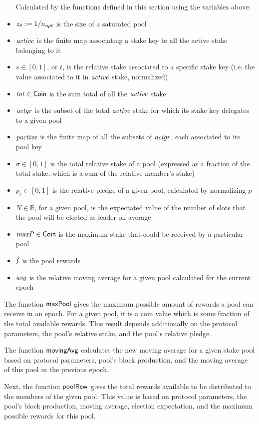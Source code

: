 \begin{itemize}
Calculated by the functions defined in this section using the variables above:
\item $\mathit{z_0} := 1/n_{opt}$ is the size of a saturated pool
\item $\mathit{active}$ is the finite map associating a stake key to all the
active stake belonging to it
\item $s \in [0,1]$, or $t$, is the relative stake associated to a specific stake key
(i.e. the value associated to it in $\mathit{active}$ stake, normalized)
\item $\mathit{tot} \in \mathsf{Coin}$ is the sum total of all the $\mathit{active}$ stake
\item $\mathit{actgr}$ is the subset of the total $\mathit{active}$ stake
for which its stake key delegates to a given pool
\item $\mathit{pactive}$ is the finite map of all the subsets of $\mathit{actgr}$,
each associated to its pool key
\item $\sigma \in [0,1]$ is the total relative stake of a pool (expressed as a fraction of
the total stake, which is a sum of the relative member's stake)
\item $p_r \in [0,1]$ is the relative pledge of a given pool, calculated by normalizing $p$
\item $\overline{N} \in \mathbb{R}$, for a given pool, is the expectated value of the number
of slots that the pool will be elected as leader on average
\item $\mathit{maxP} \in \mathsf{Coin}$ is the maximum stake that could be received by a particular
pool
\item $\mathit{\hat{f}}$ is the pool rewards
\item $\mathit{avg}$ is the relative moving average for a given pool calculated for
the current epoch
\end{itemize}

The function $\mathsf{maxPool}$ gives the maximum possible amount of rewards a pool
can receive in an epoch. For a given pool, it is a coin value which is some fraction of
the total available rewards. This result depends additionally on the protocol
parameters, the pool's relative stake, and the pool's relative pledge.

The function $\mathsf{movingAvg}$ calculates the new moving average for a
given stake pool based on protocol parameters, pool's block production, and
the moving average of this pool in the previous epoch.

Next, the function $\mathsf{poolRew}$ gives the total rewards available to be distributed
to the members of the given pool. This value is based on protocol parameters,
the pool's block production, moving average, election expectation, and the maximum
possible rewards for this pool.

